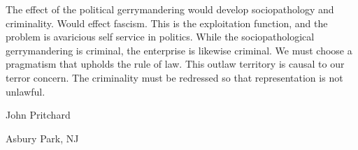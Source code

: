 The effect of the political gerrymandering would develop
sociopathology and criminality.  Would effect fascism.  This is the
exploitation function, and the problem is avaricious self service in
politics.  While the sociopathological gerrymandering is criminal, the
enterprise is likewise criminal.  We must choose a pragmatism that
upholds the rule of law.  This outlaw territory is causal to our
terror concern.  The criminality must be redressed so that
representation is not unlawful.

\bigskip
{\hfill {\ninesl John Pritchard}}

{\hfill {\ninesl Asbury Park, NJ}}

\bye
